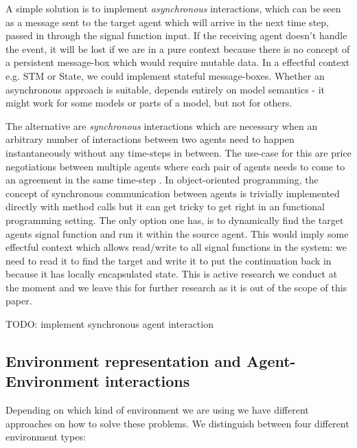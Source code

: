 A simple solution is to implement \textit{asynchronous} interactions, which can be seen as a message sent to the target agent which will arrive in the next time step, passed in through the signal function input. If the receiving agent doesn't handle the event, it will be lost if we are in a pure context because there is no concept of a persistent message-box which would require mutable data. In a effectful context e.g. STM or State, we could implement stateful message-boxes. Whether an asynchronous approach is suitable, depends entirely on model semantics - it might work for some models or parts of a model, but not for others.

The alternative are \textit{synchronous} interactions which are necessary when an arbitrary number of interactions between two agents need to happen instantaneously without any time-steps in between. The use-case for this are price negotiations between multiple agents where each pair of agents needs to come to an agreement in the same time-step \cite{epstein_growing_1996}. In object-oriented programming, the concept of synchronous communication between agents is trivially implemented directly with method calls but it can get tricky to get right in an functional programming setting. The only option one has, is to dynamically find the target agents signal function and run it within the source agent. This would imply some effectful context which allows read/write to all signal functions in the system: we need to read it to find the target and write it to put the continuation back in because it has locally encapsulated state. This is active research we conduct at the moment and we leave this for further research as it is out of the scope of this paper.

TODO: implement synchronous agent interaction

\subsection{Environment representation and Agent-Environment interactions}
Depending on which kind of environment we are using we have different approaches on how to solve these problems. We distinguish between four different environment types:

